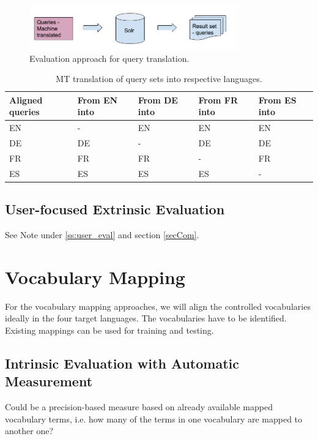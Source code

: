 \documentclass[a4paper,11pt]{article}
\begin{document}
\begin{figure}[h]
	\centering
  \includegraphics[width=0.8\textwidth]{./img/queriesMT.png}
	\caption{Evaluation approach for query translation.}
	\label{fig:queriesMT}
\end{figure}


\begin{table}[h]
 \centering\textbf{}
\begin{tabular}[h]{lllll}
    \toprule
    Aligned queries & From EN into & From DE into & From FR into & From ES into \\
    \midrule
	EN  &  -  & \cellcolor{green!25} EN  &  \cellcolor{green!25}EN  & \cellcolor{green!25}EN \\
	DE  & \cellcolor{green!25}DE  & -  & \cellcolor{green!25}DE  & \cellcolor{green!25}DE \\
	FR  & \cellcolor{green!25}FR  & \cellcolor{green!25}FR  & -  & \cellcolor{green!25}FR \\
	ES  & \cellcolor{green!25}ES  & \cellcolor{green!25}ES  & \cellcolor{green!25}ES  & - \\
    \bottomrule
 \end{tabular}
  \caption{MT translation of query sets into respective languages.}
 \label{tab:queries}
\end{table}

\subsection{User-focused Extrinsic Evaluation}
See Note under \ref{ss:user_eval} and section \ref{secCom}.


\section{Vocabulary Mapping}
For the vocabulary mapping approaches, we will align the controlled vocabularies ideally in the four target languages. The vocabularies have to be identified. Existing mappings can be used for training and testing.

\subsection{Intrinsic Evaluation with Automatic Measurement}
Could be a precision-based measure based on already available mapped vocabulary terms, i.e. how many of the terms in one vocabulary are mapped to another one?
\end{document}
